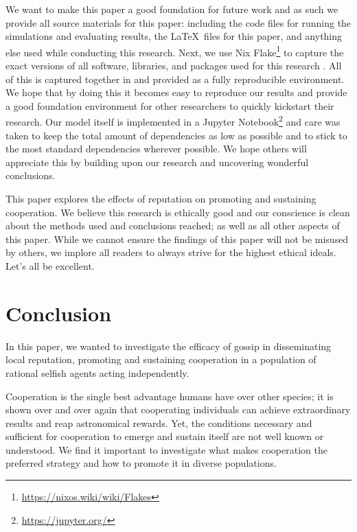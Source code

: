 \documentclass[english]{article}
\begin{document}
We want to make this paper a good foundation for future work and as such we provide all source materials for this paper: including the code files for running the simulations and evaluating results, the \LaTeX\ files for this paper, and anything else used while conducting this research.
Next, we use Nix Flake\footnote{\url{https://nixos.wiki/wiki/Flakes}} to capture the exact versions of all software, libraries, and packages used for this research \citep{nix}. All of this is captured together in and provided as a fully reproducible environment.
We hope that by doing this it becomes easy to reproduce our results and provide a good foundation environment for other researchers to quickly kickstart their research.
Our model itself is implemented in a Jupyter Notebook\footnote{\url{https://jupyter.org/}} and care was taken to keep the total amount of dependencies as low as possible and to stick to the most standard dependencies wherever possible.
We hope others will appreciate this by building upon our research and uncovering wonderful conclusions.

This paper explores the effects of reputation on promoting and sustaining cooperation.
We believe this research is ethically good and our conscience is clean about the methods used and conclusions reached; as well as all other aspects of this paper.
While we cannot ensure the findings of this paper will not be misused by others, we implore all readers to always strive for the highest ethical ideals.
Let's all be excellent.




\section{Conclusion}
In this paper, we wanted to investigate the efficacy of gossip in disseminating local reputation, promoting and sustaining cooperation in a population of rational selfish agents acting independently.

Cooperation is the single best advantage humans have over other species;
it is shown over and over again that cooperating individuals can achieve extraordinary results and reap astronomical rewards.
Yet, the conditions necessary and sufficient for cooperation to emerge and sustain itself are not well known or understood.
We find it important to investigate what makes cooperation the preferred strategy and how to promote it in diverse populations.
\end{document}
